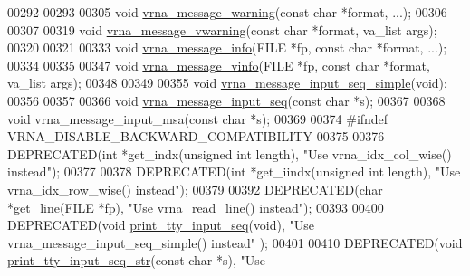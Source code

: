 \begin{DoxyCode}
00292 
00293 
00305 \textcolor{keywordtype}{void} \hyperlink{group__message__utils_ga6e07ed24add60693ba886d54d0a46635}{vrna\_message\_warning}(\textcolor{keyword}{const} \textcolor{keywordtype}{char} *format, ...);
00306 
00307 
00319 \textcolor{keywordtype}{void} \hyperlink{group__message__utils_ga377aa8ec8a49d343063adb22e6311f26}{vrna\_message\_vwarning}(\textcolor{keyword}{const} \textcolor{keywordtype}{char} *format, va\_list args);
00320 
00321 
00333 \textcolor{keywordtype}{void} \hyperlink{group__message__utils_ga039bae6153a6415b054dbe6045f83d03}{vrna\_message\_info}(FILE *fp, \textcolor{keyword}{const} \textcolor{keywordtype}{char} *format, ...);
00334 
00335 
00347 \textcolor{keywordtype}{void} \hyperlink{group__message__utils_gad8b8139bd04fbfb51e398e9fcd6908dc}{vrna\_message\_vinfo}(FILE *fp, \textcolor{keyword}{const} \textcolor{keywordtype}{char} *format, va\_list args);
00348 
00349 
00355 \textcolor{keywordtype}{void} \hyperlink{group__message__utils_gaee1dd652ca5b9e56b096963a1576f73b}{vrna\_message\_input\_seq\_simple}(\textcolor{keywordtype}{void});
00356 
00357 
00366 \textcolor{keywordtype}{void} \hyperlink{group__message__utils_gaf4d194d558b0c975f269de01dea52460}{vrna\_message\_input\_seq}(\textcolor{keyword}{const} \textcolor{keywordtype}{char} *s);
00367 
00368 \textcolor{keywordtype}{void} vrna\_message\_input\_msa(\textcolor{keyword}{const} \textcolor{keywordtype}{char} *s);
00369 
00374 \textcolor{preprocessor}{#ifndef VRNA\_DISABLE\_BACKWARD\_COMPATIBILITY}
00375 
00376 DEPRECATED(\textcolor{keywordtype}{int}   *get\_indx(\textcolor{keywordtype}{unsigned} \textcolor{keywordtype}{int} length), \textcolor{stringliteral}{"Use vrna\_idx\_col\_wise() instead"});
00377 
00378 DEPRECATED(\textcolor{keywordtype}{int}   *get\_iindx(\textcolor{keywordtype}{unsigned} \textcolor{keywordtype}{int} length), \textcolor{stringliteral}{"Use vrna\_idx\_row\_wise() instead"});
00379 
00392 DEPRECATED(\textcolor{keywordtype}{char}  *\hyperlink{utils_2basic_8h_abe51806d14cff0789a8c1df7dbc45b71}{get\_line}(FILE *fp), \textcolor{stringliteral}{"Use vrna\_read\_line() instead"});
00393 
00400 DEPRECATED(\textcolor{keywordtype}{void} \hyperlink{utils_2basic_8h_a6bf778117d31b7fd90db435323f4ef74}{print\_tty\_input\_seq}(\textcolor{keywordtype}{void}), \textcolor{stringliteral}{"Use vrna\_message\_input\_seq\_simple() instead"}
      );
00401 
00410 DEPRECATED(\textcolor{keywordtype}{void} \hyperlink{utils_2basic_8h_ae4ef89b662a3e9b5b5f0781d9757aba0}{print\_tty\_input\_seq\_str}(\textcolor{keyword}{const} \textcolor{keywordtype}{char} *s), \textcolor{stringliteral}{"Use
}
\end{DoxyCode}
